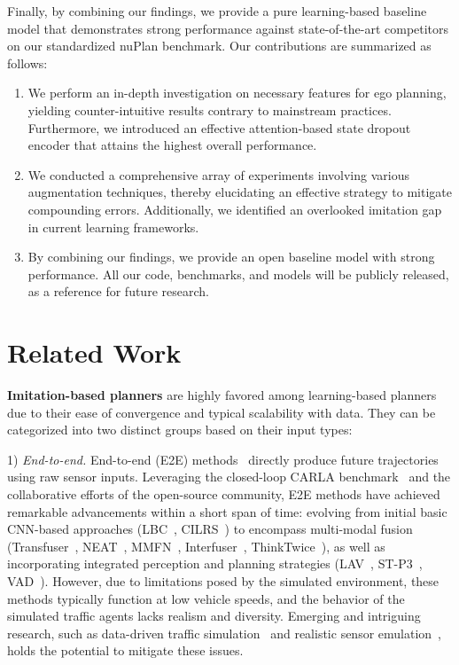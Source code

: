 \documentclass[letterpaper, 10 pt, conference]{ieeeconf}  %
\renewcommand{\paragraph}[1]{\vspace{1.25mm}\noindent\textbf{#1}}
\begin{document}
Finally, by combining our findings, we provide a pure learning-based baseline model that demonstrates strong performance against state-of-the-art competitors on our standardized nuPlan benchmark.  Our contributions are summarized as follows:
\begin{enumerate}
    \item We perform an in-depth investigation on necessary features for ego planning, yielding counter-intuitive results contrary to mainstream practices. Furthermore, we introduced an effective attention-based state dropout encoder that attains the highest overall performance. 
    \item We conducted a comprehensive array of experiments involving various augmentation techniques, thereby elucidating an effective strategy to mitigate compounding errors. Additionally, we identified an overlooked imitation gap in current learning frameworks.
    \item By combining our findings, we provide an open baseline model with strong performance. All our code, benchmarks, and models will be publicly released, as a reference for future research. 
\end{enumerate}

\section{Related Work}

\paragraph{Imitation-based planners} 
are highly favored among learning-based planners due to their ease of convergence and typical scalability with data. They can be categorized into two distinct groups based on their input types:	

1) \textit{End-to-end.} 
End-to-end (E2E) methods~\cite{zeng2019nmp,hu2022st-p3,hu2023uniAD,jiang2023vad,codevilla2019cilrs,chen2020lbc,chen2022lav,chitta2021neat,chitta2022transfuser,zhang2022mmfn, shao2023interfuser, jia2023think} directly produce future trajectories using raw sensor inputs. 
Leveraging the closed-loop CARLA benchmark~\cite{dosovitskiy2017carla} and the collaborative efforts of the open-source community, E2E methods have achieved remarkable advancements within a short span of time: evolving from initial basic CNN-based approaches (LBC~\cite{chen2020lbc}, CILRS~\cite{codevilla2019cilrs}) to encompass multi-modal fusion (Transfuser~\cite{chitta2022transfuser}, NEAT~\cite{chitta2021neat}, MMFN~\cite{zhang2022mmfn}, Interfuser~\cite{chitta2022transfuser}, ThinkTwice~\cite{jia2023think}), as well as incorporating integrated perception and planning strategies (LAV~\cite{chen2022lav}, ST-P3~\cite{hu2022st-p3}, VAD~\cite{jiang2023vad}). 
However, due to limitations posed by the simulated environment, these methods typically function at low vehicle speeds, and the behavior of the simulated traffic agents lacks realism and diversity. 
Emerging and intriguing research, such as data-driven traffic simulation~\cite{igl2022symphony,li2023scenarionet} and realistic sensor emulation~\cite{amini2022vista,wu2023mars}, holds the potential to mitigate these issues.	
\end{document}
